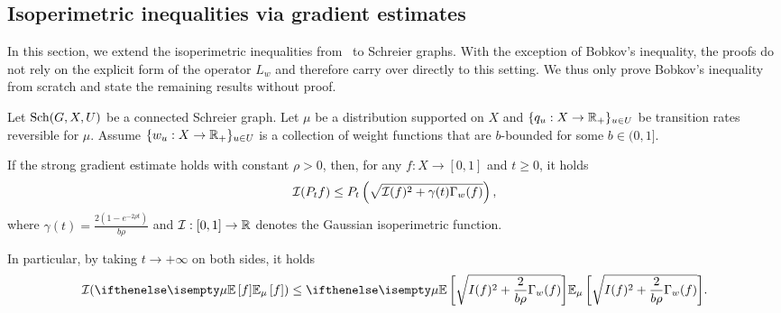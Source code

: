 
\subsection{Isoperimetric inequalities via gradient estimates}\label{sec:SGraph_iso_ineq}

In this section, we extend the isoperimetric inequalities from~ to Schreier graphs. With the exception of Bobkov's inequality, the proofs do not rely on the explicit form of the operator $L_w$ and therefore carry over directly to this setting. We thus only prove Bobkov's inequality from scratch and state the remaining results without proof.

\begin{theorem}\label{lem:local_bobkov-sch}
    Let $\mathrm{Sch}(G,X,U)$ be a connected Schreier graph. Let $\mu$ be a distribution supported on $X$ and $\{q_u: X \to \mathbb{R}_+\}_{u \in U}$ be transition rates reversible for $\mu$. 
    Assume $\{w_u:X \to \mathbb{R}_+\}_{u\in U}$ is a collection of weight functions that are $b$-bounded for some $b \in (0,1]$. 
    
    If the strong gradient estimate holds with constant $\rho > 0$,
    then, for any $f:X \to [0,1]$ and $t\geq 0$, it holds
    \begin{align}\label{eq:local_bobkov-sch}
        \mathcal{I}(P_t f)\leq P_t\left(\sqrt{\mathcal{I}(f)^2 + \gamma(t) \Gamma_w(f)}\right),
    \end{align}
    where $\gamma(t) = \frac{2(1-e^{-2\rho t})}{b \rho}$ and $\mathcal{I}:[0,1] \to \mathbb{R}$ denotes the Gaussian isoperimetric function.

    In particular, by taking $t \to +\infty$ on both sides, it holds
    \begin{align*}
        \+I(\E[\mu]{f}) \le \E[\mu]{\sqrt{I(f)^2 + \frac{2}{b \rho} \Gamma_w(f)}}.
    \end{align*}
\end{theorem}

